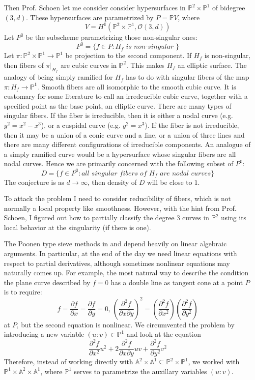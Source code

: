 \documentclass[12pt]{article}
\theoremstyle{plain}
\theoremstyle{definition}
\newcommand{\IA}{\mathbb{A}}
\newcommand{\IP}{\mathbb{P}}
\newcommand{\sO}{\mathcal{O}}
\newcommand{\<}{\langle}
\renewcommand{\>}{\rangle}
\newcommand{\p}{\partial}
\begin{document}
Then Prof. Schoen let me consider consider hypersurfaces in $\IP^2 \times \IP^1$ of bidegree $(3, d)$. These hypersurfaces are parametrized by $P = \IP V$, where
$$ V = H^0 ( \IP^2 \times \IP^1, \sO(3, d) ) $$
Let $P^0$ be the subscheme parametrizing those non-singular ones:
$$ P^0 = \{ f \in P : H_f \textit{ is non-singular }\} $$
Let $\pi : \IP^2 \times \IP^1 \to \IP^1$ be projection to the second component. If $H_f$ is non-singular, then fibers of $\pi|_{H_f}$ are cubic curves in $\IP^2$. This makes $H_f$ an elliptic surface. The analogy of being simply ramified for $H_f$ has to do with singular fibers of the map $\pi : H_f \to \IP^1$. Smooth fibers are all isomorphic to the smooth cubic curve. It is customary for some literature to call an irredcucible cubic curve, together with a specified point as the base point, an elliptic curve. There are many types of singular fibers. If the fiber is irreducible, then it is either a nodal curve (e.g. $y^2 = x^2 - x^3$), or a cuspidal curve (e.g. $y^2 = x^3$). If the fiber is not irreducible, then it may be a union of a conic curve and a line, or a union of three lines and there are many different configurations of irreducible components. 
An analogue of a simply ramified curve would be a hypersurface whose singular fibers are all nodal curves. Hence we are primarily concerned with the following subset of $P^0$: 
$$ D = \{ f \in P^0 : \textit{all singular fibers of $H_f$ are nodal curves} \}$$
The conjecture is as $d \to \infty$, then density of $D$ will be close to $1$. 

To attack the problem I need to consider reducibility of fibers, which is not normally a local property like smoothness. However, with the hint from Prof. Schoen, I figured out how to partially classify the degree 3 curves in $\IP^2$ using its local behavior at the singularity (if there is one). 

The Poonen type sieve methods in \cite{Poonen} and \cite{Wood} depend heavily on linear algebraic arguments. In particular, at the end of the day we need linear equations with respect to partial derivatives, although sometimes nonlinear equations may naturally comes up. For example, the most natural way to describe the condition the plane curve described by $f = 0$ has a double line as tangent cone at a point $P$ is to require:
$$f = \frac{\p f}{\p x} = \frac{\p f}{\p y} = 0,\, (\frac{\p^2 f}{\p x \p y})^2 = (\frac{\p^2 f}{\p x^2})(\frac{\p^2 f}{\p y^2})$$ at $P$, but the second equation is 
nonlinear. We circumvented the problem by introducing a new variable $(u : v) \in \IP^1$ and look at the equation
$$ \frac{\p^2 f}{\p x^2} u^2 + 2 \frac{\p^2 f}{\p x \p y} uv + \frac{\p^2 f}{\p y^2} v^2 $$ Therefore, instead of working directly with $\IA^2 \times \IA^1 \subseteq \IP^2 \times \IP^1$, we worked with $\IP^1 \times \IA^2 \times \IA^1$, where $\IP^1$ serves to parametrize the auxillary variables $(u : v)$. 
\end{document}
